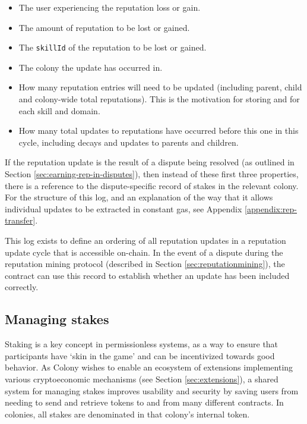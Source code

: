\begin{itemize}
\item The user experiencing the reputation loss or gain.
\item The amount of reputation to be lost or gained.
\item The \texttt{skillId} of the reputation to be lost or gained.
\item The colony the update has occurred in.
\item How many reputation entries will need to be updated (including parent, child and colony-wide total reputations). This is the motivation for storing  and  for each skill and domain.
\item How many total updates to reputations have occurred before this one in this cycle, including decays and updates to parents and children.
\end{itemize}

If the reputation update is the result of a dispute being resolved (as outlined in Section \ref{sec:earning-rep-in-disputes}), then instead of these first three properties, there is a reference to the dispute-specific record of stakes in the relevant colony. For the structure of this log, and an explanation of the way that it allows individual updates to be extracted in constant gas, see Appendix \ref{appendix:rep-transfer}.

This log exists to define an ordering of all reputation updates in a reputation update cycle that is accessible on-chain. In the event of a dispute during the reputation mining protocol (described in Section \ref{sec:reputationmining}), the  contract can use this record to establish whether an update has been included correctly.

\subsection{Managing stakes}\label{sec:stakes}

Staking is a key concept in permissionless systems, as a way to ensure that participants have `skin in the game' and can be incentivized towards good behavior. As Colony wishes to enable an ecosystem of extensions implementing various cryptoeconomic mechanisms (see Section \ref{sec:extensions}), a shared system for managing stakes improves usability and security by saving users from needing to send and retrieve tokens to and from many different contracts. In colonies, all stakes are denominated in that colony's internal token.

